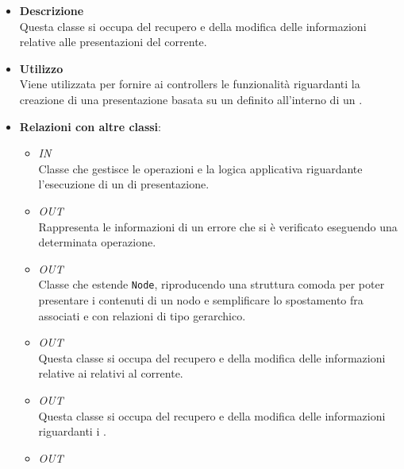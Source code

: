 \FloatBarrier
\begin{itemize}
\item \textbf{Descrizione}\\
Questa classe si occupa del recupero e della modifica delle informazioni relative alle presentazioni del  corrente.
\item \textbf{Utilizzo}\\
Viene utilizzata per fornire ai controllers le funzionalità riguardanti la creazione di una presentazione basata su un  definito all'interno di un .
\item \textbf{Relazioni con altre classi}:
\begin{itemize}
\item \textit{IN} \hyperref[\nogloxy{Premi::Front-End::Controllers::PresentationViewerController}]{}\\
Classe che gestisce le operazioni e la logica applicativa riguardante l’esecuzione di un  di presentazione.
\item \textit{OUT} \hyperref[\nogloxy{Premi::Front-End::Model::ErrorInfo}]{}\\
Rappresenta le informazioni di un errore che si è verificato eseguendo una determinata operazione.
\item \textit{OUT} \hyperref[\nogloxy{Premi::Front-End::Model::PresentationNode}]{}\\
Classe che estende \texttt{Node}, riproducendo una struttura comoda per poter presentare i contenuti di un nodo e semplificare lo spostamento fra  associati e con relazioni di tipo gerarchico.
\item \textit{OUT} \hyperref[\nogloxy{Premi::Front-End::Services::PathService}]{}\\
Questa classe si occupa del recupero e della modifica delle informazioni relative ai  relativi al  corrente.
\item \textit{OUT} \hyperref[\nogloxy{Premi::Front-End::Services::ProjectService}]{}\\
Questa classe si occupa del recupero e della modifica delle informazioni riguardanti i .
\item \textit{OUT} \hyperref[\nogloxy{Premi::Front-End::Services::ServerURL}]{}\\

\end{itemize}
\end{itemize}
